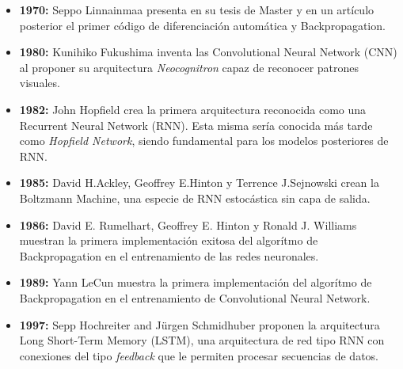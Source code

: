 \begin{itemize}
    \item \textbf{1970:} Seppo Linnainmaa presenta en su tesis de Master y en un artículo posterior
            el primer código de diferenciación automática y Backpropagation.  \cite{linnainmaaTaylorExpansionAccumulated1976} \\

    \item \textbf{1980:} Kunihiko Fukushima inventa las Convolutional Neural Network (CNN) al proponer
    su arquitectura \emph{Neocognitron} capaz de reconocer patrones visuales. \cite{fukushimaNeocognitronSelforganizingNeural1980}\\


    \item \textbf{1982:} John Hopfield crea la primera arquitectura reconocida como una Recurrent Neural Network (RNN).
            Esta misma sería conocida más tarde como \emph{Hopfield Network}, siendo fundamental
            para los modelos posteriores de RNN. \cite{hopfieldNeuralNetworksPhysical1982}\\

    \item \textbf{1985:} David H.Ackley, Geoffrey E.Hinton y Terrence J.Sejnowski crean la Boltzmann Machine,
    una especie de RNN estocástica sin capa de salida. \cite{ackleyLearningAlgorithmBoltzmann1985}\\


    \item \textbf{1986:} David E. Rumelhart, Geoffrey E. Hinton y Ronald J. Williams muestran la primera implementación
        exitosa del algorítmo de Backpropagation en el entrenamiento de las redes neuronales.
    \cite{rumelhartLearningRepresentationsBackpropagating1986}\\
    \item \textbf{1989:} Yann LeCun muestra la primera implementación del algorítmo de Backpropagation
    en el entrenamiento de Convolutional Neural Network.\cite{lecunBackpropagationAppliedHandwritten1989}\\

    \item \textbf{1997:} Sepp Hochreiter and Jürgen Schmidhuber proponen la arquitectura Long Short-Term Memory (LSTM), una
    arquitectura de red tipo RNN con conexiones del tipo \emph{feedback} que le permiten procesar secuencias
    de datos. \cite{hochreiterLongShortTermMemory1997}\\


\end{itemize}
